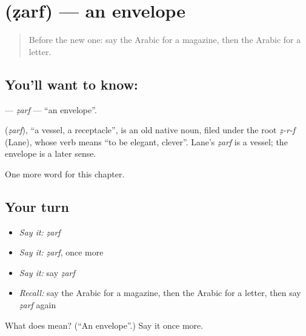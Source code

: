 \section[\texorpdfstring{\ar{ظرف} (ẓarf)}{ظرف (ẓarf)}]{ (ẓarf) — an envelope}

\label{lesson:AR-C117-zarf}



\begin{quote}
Before the new one: say the Arabic for a magazine, then the Arabic for a letter.
\end{quote}

\subsection*{You'll want to know: }
\textbf{} — \emph{ẓarf} — \textquotedblleft{}an envelope\textquotedblright{}.

\begin{cousinweb}
\textbf{} (\emph{ẓarf}), \textquotedblleft{}a vessel, a receptacle\textquotedblright{}, is an old native noun, filed under the root \emph{ẓ-r-f} (Lane), whose verb means \textquotedblleft{}to be elegant, clever\textquotedblright{}. Lane's \emph{ẓarf} is a vessel; the envelope is a later sense.
\end{cousinweb}

\begin{grammarlens}[title={What you've built}]
One more word for this chapter.
\end{grammarlens}

\subsection*{Your turn}
\begin{itemize}
\raggedright
  \item \emph{Say it:} \emph{ẓarf}
  \item \emph{Say it:} \emph{ẓarf}, once more
  \item \emph{Say it:} say \emph{ẓarf}
  \item \emph{Recall:} say the Arabic for a magazine, then the Arabic for a letter, then say \emph{ẓarf} again
\end{itemize}

\begin{tcolorbox}[breakable,colback=teal!4,colframe=teal!35!black,title={Before you move on}]
What does  mean? (\textquotedblleft{}An envelope\textquotedblright{}.) Say it once more.
\end{tcolorbox}
